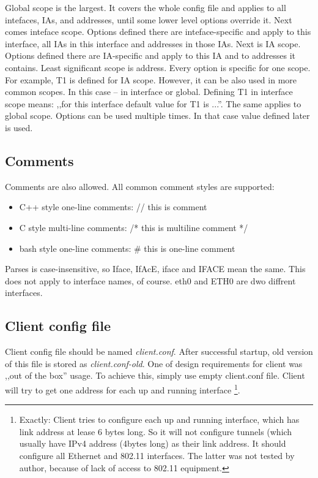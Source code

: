 Global scope is the largest. It covers the whole config file and
applies to all intefaces, IAs, and addresses, until some lower level
options override it. Next comes inteface scope. Options defined there
are inteface-specific and apply to this interface, all IAs in this
interface and addresses in those IAs. Next is IA scope. Options
defined there are IA-specific and apply to this IA and to addresses it
contains. Least significant scope is address. Every option is specific
for one scope. For example, T1 is defined for
IA scope. However, it can be also used in more common scopes. In this
case -- in interface or global. Defining T1 in interface scope means:
,,for this interface default value for T1 is ...''. The same applies
to global scope. Options can be used multiple times. In that case
value defined later is used.

\subsection{Comments}

Comments are also allowed. All common comment styles are supported:
\begin{itemize}
\item C++ style one-line comments: // this is comment
\item C style multi-line comments: /* this is multiline comment */
\item bash style one-line comments: \# this is one-line comment
\end{itemize}

Parses is case-insensitive, so Iface, IfAcE, iface and IFACE mean the
same. This does not apply to interface names, of course. eth0 and ETH0
are dwo diffrent interfaces.

\subsection{Client config file}

Client config file should be named \emph{client.conf}. After
successful startup, old version of this file is stored as
\emph{client.conf-old}. One of design requirements for client was
,,out of the box'' usage. To achieve this, simply use empty
client.conf file. Client will try to get one address for each up and
running interface \footnote{Exactly: Client tries to configure each up
  and running interface, which has link address at lease 6 bytes
  long. So it will not configure tunnels (which usually have IPv4
  address (4bytes long) as their link address. It should configure all
  Ethernet and 802.11 interfaces. The latter was not tested by author,
  because of lack of access to 802.11 equipment.}.


